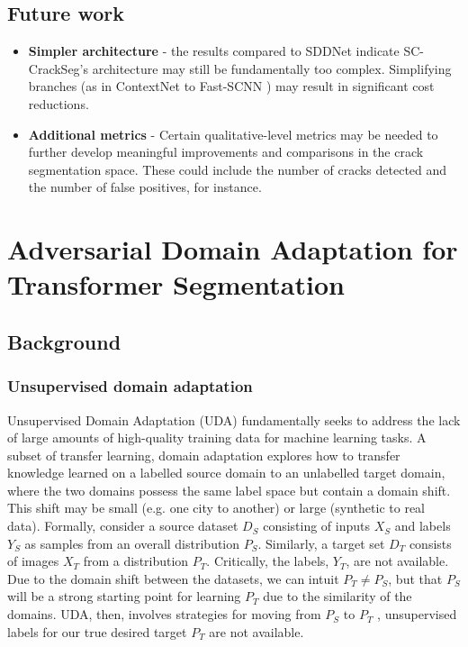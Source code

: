 \documentclass[a4paper,12pt]{report}
\begin{document}
\section{Future work}
\begin{itemize}
    \item \textbf{Simpler architecture} - the results compared to SDDNet indicate SC-CrackSeg's architecture may still be fundamentally too complex. Simplifying branches (as in ContextNet \cite{poudel_contextnet_2018} to Fast-SCNN \cite{poudel_fast-scnn_2019}) may result in significant cost reductions.
    \item \textbf{Additional metrics} - Certain qualitative-level metrics may be needed to further develop meaningful improvements and comparisons in the crack segmentation space. These could include the number of cracks detected and the number of false positives, for instance.
\end{itemize}

\chapter{Adversarial Domain Adaptation for Transformer Segmentation}

\section{Background}

\subsection{Unsupervised domain adaptation}
Unsupervised Domain Adaptation (UDA) fundamentally seeks to address the lack of large amounts of high-quality training data for machine learning tasks. A subset of transfer learning, domain adaptation explores how to transfer knowledge learned on a labelled source domain to an unlabelled target domain, where the two domains possess the same label space but contain a domain shift. This shift may be small (e.g. one city to another) or large (synthetic to real data). Formally, consider a source dataset $D_S$ consisting of inputs $X_S$ and labels $Y_S$ as samples from an overall distribution $P_S$. Similarly, a target set $D_T$ consists of images $X_T$ from a distribution $P_T$. Critically, the labels, $Y_T$, are not available. Due to the domain shift between the datasets, we can intuit $P_T \neq P_S$, but that $P_S$ will be a strong starting point for learning $P_T$ due to the similarity of the domains. UDA, then, involves strategies for moving from $P_S$ to $P_T$ \cite{wilson_survey_2020}, unsupervised labels for our true desired target $P_T$ are not available.
\end{document}
